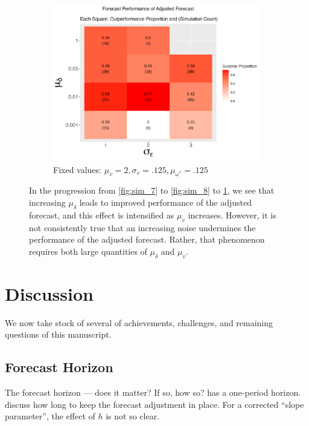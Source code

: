 \documentclass{uiucthesis2021}
\theoremstyle{definition}
\begin{document}
\begin{figure}[!h]
        \begin{subfigure}{.44\linewidth} 
          \centering
            \includegraphics[scale=.42]{simulation_plots/Nov27_160348_2024_mudelta_sigmaepsilon.png}
            \caption{Fixed values: $\mu_{v} = 2, \sigma_{v} = .125, \mu_{\omega^{*}} = .125$}\label{fig:sim_9}
        \end{subfigure}
        
            \caption{In the progression from \ref{fig:sim_7} to \ref{fig:sim_8} to \ref{fig:sim_9}, we see that increasing $\mu_{\delta}$ leads to improved performance of the adjusted forecast, and this effect is intensified as $\mu_{v}$ increases.  However, it is not consistently true that an increasing noise undermines the performance of the adjusted forecast.  Rather, that phenomenon requires both large quantities of $\mu_{\delta}$ and $\mu_{v}$.}
            \label{fig:set_of_three_three}
          \end{figure}
    \clearpage 
  
  \section{Discussion}

  We now take stock of several of achievements, challenges, and remaining questions of this manuscript.

  \subsection{Forecast Horizon}
  
  The forecast horizon --- does it matter?  If so, how so?  \cite[][]{lin2021minimizing} has a one-period horizon.  \cite[][p. 203]{clements1998forecasting} discuss how long to keep the forecast adjustment in place.  For a corrected ``slope parameter'', the effect of $h$ is not so clear.\\
  
\end{document}
